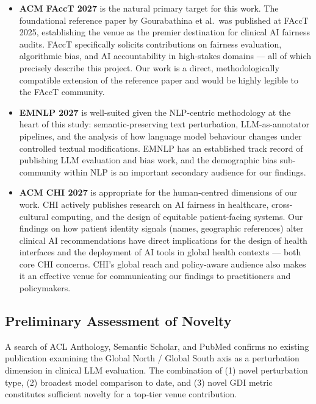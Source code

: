 \documentclass[12pt, a4paper]{article}
\begin{document}
\begin{itemize}
  \item \textbf{ACM FAccT 2027} is the natural primary target for this work. The foundational reference paper by Gourabathina et al.\ was published at FAccT 2025, establishing the venue as the premier destination for clinical AI fairness audits. FAccT specifically solicits contributions on fairness evaluation, algorithmic bias, and AI accountability in high-stakes domains --- all of which precisely describe this project. Our work is a direct, methodologically compatible extension of the reference paper and would be highly legible to the FAccT community.

  \item \textbf{EMNLP 2027} is well-suited given the NLP-centric methodology at the heart of this study: semantic-preserving text perturbation, LLM-as-annotator pipelines, and the analysis of how language model behaviour changes under controlled textual modifications. EMNLP has an established track record of publishing LLM evaluation and bias work, and the demographic bias sub-community within NLP is an important secondary audience for our findings.

  \item \textbf{ACM CHI 2027} is appropriate for the human-centred dimensions of our work. CHI actively publishes research on AI fairness in healthcare, cross-cultural computing, and the design of equitable patient-facing systems. Our findings on how patient identity signals (names, geographic references) alter clinical AI recommendations have direct implications for the design of health interfaces and the deployment of AI tools in global health contexts --- both core CHI concerns. CHI's global reach and policy-aware audience also makes it an effective venue for communicating our findings to practitioners and policymakers.
\end{itemize}

\subsection{Preliminary Assessment of Novelty}

A search of ACL Anthology, Semantic Scholar, and PubMed confirms no existing publication examining the Global North / Global South axis as a perturbation dimension in clinical LLM evaluation. The combination of (1) novel perturbation type, (2) broadest model comparison to date, and (3) novel GDI metric constitutes sufficient novelty for a top-tier venue contribution.
\end{document}
